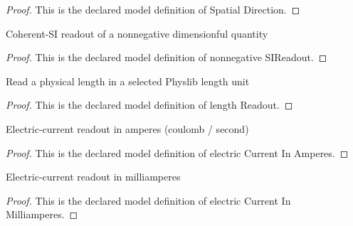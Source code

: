 \begin{proof}
  This is the declared model definition of Spatial Direction.
\end{proof}
\begin{definition}
  \label{def:physics:phyx-mini-0626:phyxminiproblems-problemphyxmini0626-nonnegativesireadout}
  Coherent-SI readout of a nonnegative dimensionful quantity
\end{definition}
\begin{proof}
  This is the declared model definition of nonnegative SIReadout.
\end{proof}
\begin{definition}
  \label{def:physics:phyx-mini-0626:phyxminiproblems-problemphyxmini0626-lengthreadout}
  Read a physical length in a selected Physlib length unit
\end{definition}
\begin{proof}
  This is the declared model definition of length Readout.
\end{proof}
\begin{definition}
  \label{def:physics:phyx-mini-0626:phyxminiproblems-problemphyxmini0626-electriccurrentinamperes}
  Electric-current readout in amperes (coulomb / second)
\end{definition}
\begin{proof}
  This is the declared model definition of electric Current In Amperes.
\end{proof}
\begin{definition}
  \label{def:physics:phyx-mini-0626:phyxminiproblems-problemphyxmini0626-electriccurrentinmilliamperes}
  Electric-current readout in milliamperes
\end{definition}
\begin{proof}
  This is the declared model definition of electric Current In Milliamperes.
\end{proof}
